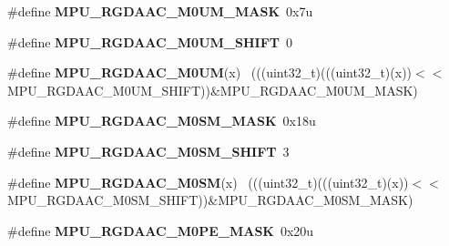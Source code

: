 \begin{DoxyCompactItemize}
\item 
\hypertarget{group___m_p_u___register___masks_gaa4855af22b69592db90ae0eef06608fc}{}\#define {\bfseries M\+P\+U\+\_\+\+R\+G\+D\+A\+A\+C\+\_\+\+M0\+U\+M\+\_\+\+M\+A\+S\+K}~0x7u\label{group___m_p_u___register___masks_gaa4855af22b69592db90ae0eef06608fc}

\item 
\hypertarget{group___m_p_u___register___masks_ga3ba290e2151d652e653e23a97738b1e5}{}\#define {\bfseries M\+P\+U\+\_\+\+R\+G\+D\+A\+A\+C\+\_\+\+M0\+U\+M\+\_\+\+S\+H\+I\+F\+T}~0\label{group___m_p_u___register___masks_ga3ba290e2151d652e653e23a97738b1e5}

\item 
\hypertarget{group___m_p_u___register___masks_ga065c036590b595a2800d34891f5bcebb}{}\#define {\bfseries M\+P\+U\+\_\+\+R\+G\+D\+A\+A\+C\+\_\+\+M0\+U\+M}(x)                                          ~(((uint32\+\_\+t)(((uint32\+\_\+t)(x))$<$$<$M\+P\+U\+\_\+\+R\+G\+D\+A\+A\+C\+\_\+\+M0\+U\+M\+\_\+\+S\+H\+I\+F\+T))\&M\+P\+U\+\_\+\+R\+G\+D\+A\+A\+C\+\_\+\+M0\+U\+M\+\_\+\+M\+A\+S\+K)\label{group___m_p_u___register___masks_ga065c036590b595a2800d34891f5bcebb}

\item 
\hypertarget{group___m_p_u___register___masks_gada28730c0d3bd624b681e09a736c120e}{}\#define {\bfseries M\+P\+U\+\_\+\+R\+G\+D\+A\+A\+C\+\_\+\+M0\+S\+M\+\_\+\+M\+A\+S\+K}~0x18u\label{group___m_p_u___register___masks_gada28730c0d3bd624b681e09a736c120e}

\item 
\hypertarget{group___m_p_u___register___masks_gadad72890c36bcb3eea5e72c8f95af64a}{}\#define {\bfseries M\+P\+U\+\_\+\+R\+G\+D\+A\+A\+C\+\_\+\+M0\+S\+M\+\_\+\+S\+H\+I\+F\+T}~3\label{group___m_p_u___register___masks_gadad72890c36bcb3eea5e72c8f95af64a}

\item 
\hypertarget{group___m_p_u___register___masks_ga7afbf5583defee207ca692236622207f}{}\#define {\bfseries M\+P\+U\+\_\+\+R\+G\+D\+A\+A\+C\+\_\+\+M0\+S\+M}(x)                                          ~(((uint32\+\_\+t)(((uint32\+\_\+t)(x))$<$$<$M\+P\+U\+\_\+\+R\+G\+D\+A\+A\+C\+\_\+\+M0\+S\+M\+\_\+\+S\+H\+I\+F\+T))\&M\+P\+U\+\_\+\+R\+G\+D\+A\+A\+C\+\_\+\+M0\+S\+M\+\_\+\+M\+A\+S\+K)\label{group___m_p_u___register___masks_ga7afbf5583defee207ca692236622207f}

\item 
\hypertarget{group___m_p_u___register___masks_ga9971bc4d5380405e3dfc5406f198467f}{}\#define {\bfseries M\+P\+U\+\_\+\+R\+G\+D\+A\+A\+C\+\_\+\+M0\+P\+E\+\_\+\+M\+A\+S\+K}~0x20u\label{group___m_p_u___register___masks_ga9971bc4d5380405e3dfc5406f198467f}


\end{DoxyCompactItemize}

